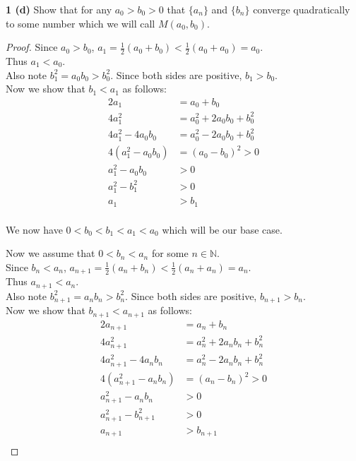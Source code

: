 \documentclass[12pt]{article}
\begin{document}
\hspace{-7 ex}\textbf{1 (d) } Show that for any $a_{0} > b_{0} > 0$ that $\{a_{n}\}$ and $\{b_{n}\}$ converge quadratically to
	some number which we will call $M(a_{0}, b_{0})$. \bigbreak
	
	\begin{proof}
		Since $a_{0} > b_{0}$, $a_{1} = \frac{1}{2} (a_{0}+b_{0}) < \frac{1}{2} (a_{0}+a_{0}) = a_{0}$. \\
		Thus $a_{1} < a_{0}$. \\
		Also note $b_{1}^{2} = a_{0}b_{0} > b_{0}^{2}$. Since both sides are positive, $b_{1} > b_{0}$. \\
		Now we show that $b_1<a_1$ as follows:\\
		\begin{align*}
			2a_1 & = a_0 + b_0 \\
			4a_1^2 & = a_0^2 + 2a_0b_0 + b_0^2 \\
			4a_1^2 - 4a_0b_0 & = a_0^2 - 2a_0b_0 + b_0^2 \\
			4(a_1^2 - a_0b_0) & = (a_0 - b_0)^2 > 0\\
			a_1^2 - a_0b_0 & > 0 \\
			a_1^2 - b_1^2 & > 0\\
			a_1 & > b_1\\
		\end{align*}
				
		We now have $0 < b_{0}< b_1 <a_{1} < a_{0}$ which will be our base case. \bigbreak
		
		Now we assume that $0< b_n <a_{n}$ for some $n \in \mathbb{N}$.\\
		Since $b_n < a_n$, $a_{n+1} = \frac{1}{2} (a_{n}+b_{n}) < \frac{1}{2} (a_{n}+a_{n}) = a_{n}$. \\
		Thus $a_{n+1} < a_{n}$. \\
		Also note $b_{n+1}^{2} = a_{n}b_{n} > b_{n}^{2}$. Since both sides are positive, $b_{n+1} > b_{n}$. \\
		Now we show that $b_{n+1}<a_{n+1}$ as follows:\\
		\begin{align*}
		2a_{n+1} & = a_n + b_n \\
		4a_{n+1}^2 & = a_n^2 + 2a_nb_n + b_n^2 \\
		4a_{n+1}^2 - 4a_nb_n & = a_n^2 - 2a_nb_n + b_n^2 \\
		4(a_{n+1}^2 - a_nb_n) & = (a_n - b_n)^2 > 0\\
		a_{n+1}^2 - a_nb_n & > 0 \\
		a_{n+1}^2 - b_{n+1}^2 & > 0\\
		a_{n+1} & > b_{n+1}\\
		\end{align*}
		

\end{proof}
\end{document}
